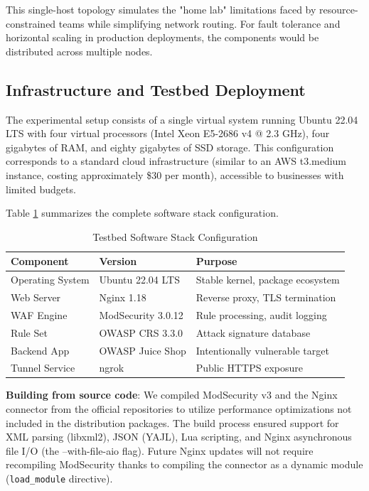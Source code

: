 \documentclass[10pt,conference]{IEEEtran}
\begin{document}
This single-host topology simulates the "home lab" limitations faced by resource-constrained teams while simplifying network routing. For fault tolerance and horizontal scaling in production deployments, the components would be distributed across multiple nodes.

\subsection{Infrastructure and Testbed Deployment}

The experimental setup consists of a single virtual system running Ubuntu 22.04 LTS with four virtual processors (Intel Xeon E5-2686 v4 @ 2.3 GHz), four gigabytes of RAM, and eighty gigabytes of SSD storage. This configuration corresponds to a standard cloud infrastructure (similar to an AWS t3.medium instance, costing approximately \$30 per month), accessible to businesses with limited budgets.

Table \ref{tab:stack} summarizes the complete software stack configuration.

\begin{table}[!h]
\centering
\caption{Testbed Software Stack Configuration}
\label{tab:stack}
\small
\begin{tabular}{|p{1.9cm}|p{1.5cm}|p{3.0cm}|}
\hline
\textbf{Component} & \textbf{Version} & \textbf{Purpose} \\
\hline
Operating System & Ubuntu 22.04 LTS & Stable kernel, package ecosystem \\
Web Server & Nginx 1.18 & Reverse proxy, TLS termination \\
WAF Engine & ModSecurity 3.0.12 & Rule processing, audit logging \\
Rule Set & OWASP CRS 3.3.0 & Attack signature database \\
Backend App & OWASP Juice Shop & Intentionally vulnerable target \\
Tunnel Service & ngrok & Public HTTPS exposure \\
\hline
\end{tabular}
\end{table}

\textbf{Building from source code}: We compiled ModSecurity v3 and the Nginx connector from the official repositories to utilize performance optimizations not included in the distribution packages. The build process ensured support for XML parsing (libxml2), JSON (YAJL), Lua scripting, and Nginx asynchronous file I/O (the --with-file-aio flag). Future Nginx updates will not require recompiling ModSecurity thanks to compiling the connector as a dynamic module (\texttt{load\_module} directive).
\end{document}
